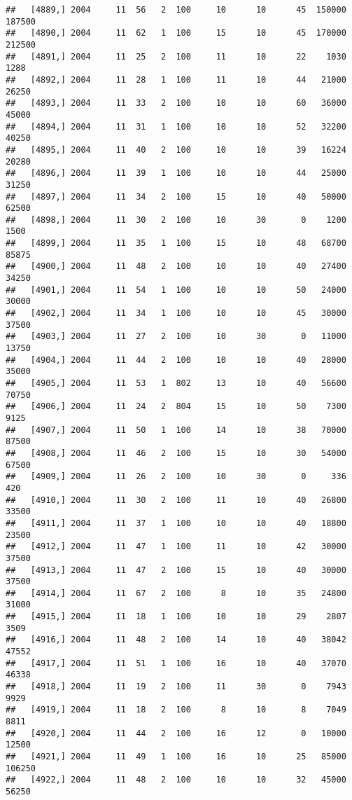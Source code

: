 \documentclass{article}\usepackage[]{graphicx}\usepackage[]{color}
\makeatletter
\newenvironment{kframe}{%
 \def\at@end@of@kframe{}%
 \ifinner\ifhmode%
  \def\at@end@of@kframe{\end{minipage}}%
  \begin{minipage}{\columnwidth}%
 \fi\fi%
 \def\FrameCommand##1{\hskip\@totalleftmargin \hskip-\fboxsep
 \colorbox{shadecolor}{##1}\hskip-\fboxsep
     \hskip-\linewidth \hskip-\@totalleftmargin \hskip\columnwidth}%
 \MakeFramed {\advance\hsize-\width
   \@totalleftmargin\z@ \linewidth\hsize
   \@setminipage}}%
 {\par\unskip\endMakeFramed%
 \at@end@of@kframe}
\newenvironment{knitrout}{}{} %
\makeatother
\begin{document}
\begin{knitrout}
\begin{kframe}
\begin{verbatim}
##   [4889,] 2004     11  56   2  100     10      10      45  150000  187500
##   [4890,] 2004     11  62   1  100     15      10      45  170000  212500
##   [4891,] 2004     11  25   2  100     11      10      22    1030    1288
##   [4892,] 2004     11  28   1  100     11      10      44   21000   26250
##   [4893,] 2004     11  33   2  100     10      10      60   36000   45000
##   [4894,] 2004     11  31   1  100     10      10      52   32200   40250
##   [4895,] 2004     11  40   2  100     10      10      39   16224   20280
##   [4896,] 2004     11  39   1  100     10      10      44   25000   31250
##   [4897,] 2004     11  34   2  100     15      10      40   50000   62500
##   [4898,] 2004     11  30   2  100     10      30       0    1200    1500
##   [4899,] 2004     11  35   1  100     15      10      48   68700   85875
##   [4900,] 2004     11  48   2  100     10      10      40   27400   34250
##   [4901,] 2004     11  54   1  100     10      10      50   24000   30000
##   [4902,] 2004     11  34   1  100     10      10      45   30000   37500
##   [4903,] 2004     11  27   2  100     10      30       0   11000   13750
##   [4904,] 2004     11  44   2  100     10      10      40   28000   35000
##   [4905,] 2004     11  53   1  802     13      10      40   56600   70750
##   [4906,] 2004     11  24   2  804     15      10      50    7300    9125
##   [4907,] 2004     11  50   1  100     14      10      38   70000   87500
##   [4908,] 2004     11  46   2  100     15      10      30   54000   67500
##   [4909,] 2004     11  26   2  100     10      30       0     336     420
##   [4910,] 2004     11  30   2  100     11      10      40   26800   33500
##   [4911,] 2004     11  37   1  100     10      10      40   18800   23500
##   [4912,] 2004     11  47   1  100     11      10      42   30000   37500
##   [4913,] 2004     11  47   2  100     15      10      40   30000   37500
##   [4914,] 2004     11  67   2  100      8      10      35   24800   31000
##   [4915,] 2004     11  18   1  100     10      10      29    2807    3509
##   [4916,] 2004     11  48   2  100     14      10      40   38042   47552
##   [4917,] 2004     11  51   1  100     16      10      40   37070   46338
##   [4918,] 2004     11  19   2  100     11      30       0    7943    9929
##   [4919,] 2004     11  18   2  100      8      10       8    7049    8811
##   [4920,] 2004     11  44   2  100     16      12       0   10000   12500
##   [4921,] 2004     11  49   1  100     16      10      25   85000  106250
##   [4922,] 2004     11  48   2  100     10      10      32   45000   56250

\end{verbatim}
\end{kframe}
\end{knitrout}
\end{document}
